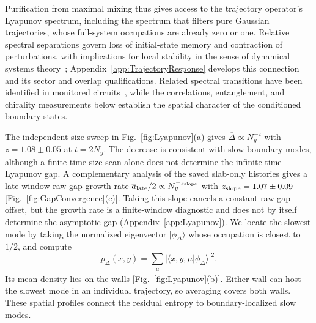 \documentclass[aps,prb,10pt,twocolumn,superscriptaddress,longbibliography,floatfix]{revtex4-2}
\newcommand{\newtext}[1]{{\color{blue}#1}}
\begin{document}
{\newtext{Purification from maximal mixing thus gives access to the trajectory operator's Lyapunov spectrum, including the spectrum that filters pure Gaussian trajectories, whose full-system occupations are already zero or one. Relative spectral separations govern loss of initial-state memory and contraction of perturbations, with implications for local stability in the sense of dynamical systems theory~\cite{BulchandaniSondhiChalker2024}; Appendix~\ref{app:TrajectoryResponse} develops this connection and its sector and overlap qualifications. Related spectral transitions have been identified in monitored circuits~\cite{Oshima2025}, while the correlations, entanglement, and chirality measurements below establish the spatial character of the conditioned boundary states.}

The independent size sweep in Fig.~\ref{fig:Lyapunov}(a) gives $\overline\Delta\propto N_y^{-z}$ with $z=1.08\pm0.05$ at $t=2N_y$. The decrease is consistent with slow boundary modes, although a finite-time size scan alone does not determine the infinite-time Lyapunov gap. \newtext{A complementary analysis of the saved slab-only histories gives a late-window raw-gap growth rate $\overline a_{\rm late}/2\propto N_y^{-z_{\rm slope}}$ with $z_{\rm slope}=1.07\pm0.09$ [Fig.~\ref{fig:GapConvergence}(c)]. Taking this slope cancels a constant raw-gap offset, but the growth rate is a finite-window diagnostic and does not by itself determine the asymptotic gap (Appendix~\ref{app:Lyapunov}).} We locate the slowest mode by taking the normalized eigenvector $|\phi_{\Delta}\rangle$ whose occupation is closest to $1/2$, and compute
\begin{equation}
 p_{\Delta}(x,y)=\sum_\mu|\langle x,y,\mu|\phi_{\Delta}\rangle|^2.
 \label{eq:SlowestModeDensity}
\end{equation}
Its mean density lies on the walls [Fig.~\ref{fig:Lyapunov}(b)]. Either wall can host the slowest mode in an individual trajectory, so averaging covers both walls. These spatial profiles connect the residual entropy to boundary-localized slow modes.

}
\end{document}

